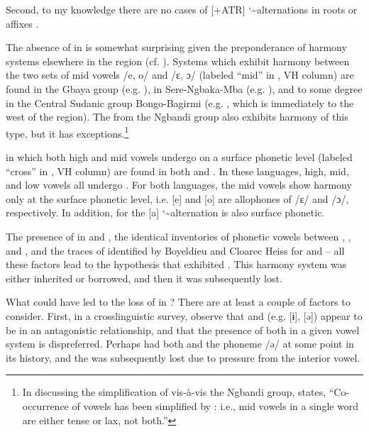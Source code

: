 \documentclass[output=paper,colorlinks,citecolor=brown]{langscibook}
\begin{document}
Second, to my knowledge there are no cases of [+ATR] \char`\~ \space [–ATR] alternations in  roots or affixes \citep[500]{Casali2008}.

The absence of  in  is somewhat surprising given the preponderance of harmony systems elsewhere in the region (cf. ). Systems which exhibit harmony between the two sets of mid vowels /e, o/ and /ɛ, ɔ/ (labeled “mid” in , VH column) are found in the Gbaya  group (e.g. ), in Sere-Ngbaka-Mba  (e.g. ), and to some degree in the Central Sudanic  group Bongo-Bagirmi  (e.g. , which is immediately to the west of the  region). The   from the Ngbandi  group also exhibits harmony of this type, but it has exceptions.\footnote{In discussing the simplification of  vis-à-vis the Ngbandi  group, \citet[313]{Samarin2000} states, “Co-occurrence of vowels has been simplified by : i.e., mid vowels in a single word are either tense or lax, not both.”}

 in which both high and mid vowels undergo  on a surface phonetic level (labeled “cross” in , VH column) are found in both  and . In these languages, high, mid, and low vowels all undergo . For both languages, the mid vowels show harmony only at the surface phonetic level, i.e. [e] and [o] are allophones of /ɛ/ and /ɔ/, respectively. In addition, for  the [a] \char`\~ \space [ə] alternation is also surface phonetic.

The presence of  in  and , the identical inventories of phonetic vowels between , , and , and the traces of  identified by Boyeldieu and Cloarec Heiss for  and  -- all these factors lead to the hypothesis that  exhibited . This harmony system was either inherited or borrowed, and then it was subsequently lost.

What could have led to the loss of  in ? There are at least a couple of factors to consider. First, in a crosslinguistic survey, \citet{RolleEtAl2017} observe that  and  (e.g. [ɨ], [ə]) appear to be in an antagonistic relationship, and that the presence of both in a given vowel system  is dispreferred. Perhaps  had both  and the phoneme /ə/ at some point in its history, and the  was subsequently lost due to pressure from the interior vowel.
\end{document}
